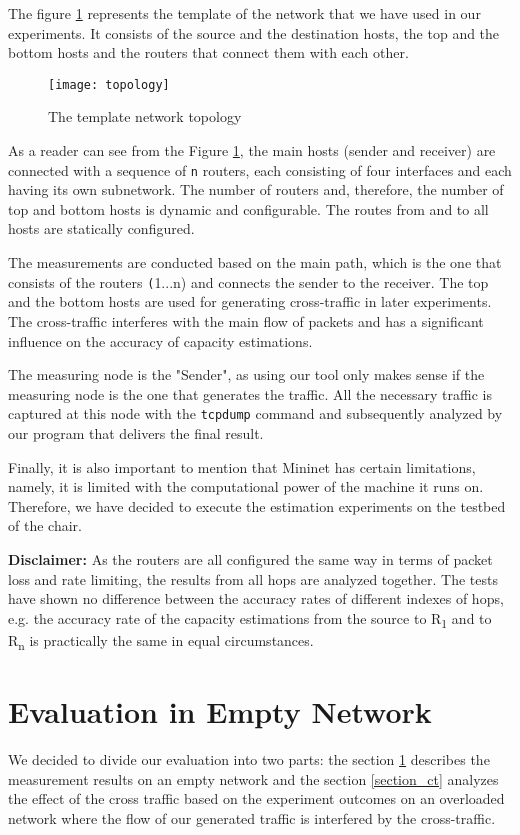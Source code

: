 The figure \ref{topology} represents the template of the network that we have used in our experiments. It consists of the source and the destination hosts, the top and the bottom hosts and the routers that connect them with each other. 

\begin{figure}[h]
 \centering
	 \texttt{[image: topology]}
 \caption{The template network topology}
 \label{topology}

\end{figure}

As a reader can see from the Figure \ref{topology}, the main hosts (sender and receiver) are connected with a sequence of \texttt{n} routers, each consisting of four interfaces and each having its own subnetwork. The number of routers and, therefore, the number of top and bottom hosts is dynamic and configurable. The routes from and to all hosts are statically configured.

The measurements are conducted based on the main path, which is the one that consists of the routers \texttt(1...n) and connects the sender to the receiver. The top and the bottom hosts are used for generating cross-traffic in later experiments. The cross-traffic interferes with the main flow of packets and has a significant influence on the accuracy of capacity estimations.

The measuring node is the "Sender", as using our tool only makes sense if the measuring node is the one that generates the traffic. All the necessary traffic is captured at this node with the \texttt{tcpdump} command and subsequently analyzed by our program that delivers the final result.

Finally, it is also important to mention that Mininet has certain limitations, namely, it is limited with the computational power of the machine it runs on. Therefore, we have decided to execute the estimation experiments on the testbed of the chair.

\textbf{Disclaimer:} As the routers are all configured the same way in terms of packet loss and  rate limiting, the results from all hops are analyzed together. The tests have shown no difference between the accuracy rates of different indexes of hops, e.g. the accuracy rate of the capacity estimations from the source to R\textsubscript{1} and to R\textsubscript{n} is practically the same in equal circumstances.

\section{Evaluation in Empty Network}
\label{empty_net}
We decided to divide our evaluation into two parts: the section \ref{empty_net} describes the measurement results on an empty network and the section \ref{section_ct} analyzes the effect of the cross traffic based on the experiment outcomes on an overloaded network where the flow of our generated traffic is interfered by the cross-traffic. 

